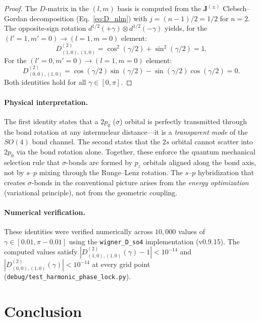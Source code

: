 \documentclass[aps,pra,twocolumn,superscriptaddress,longbibliography]{revtex4-2}
\begin{document}
\begin{proof}
The $D$-matrix in the $(l, m)$ basis is computed from the
$\mathbf{J}^{(\pm)}$ Clebsch--Gordan decomposition
(Eq.~\eqref{eq:D_nlm}) with $j = (n-1)/2 = 1/2$ for $n = 2$.
The opposite-sign rotation $d^{1/2}(+\gamma) \otimes d^{1/2}(-\gamma)$
yields, for the $(l' = 1, m' = 0) \to (l = 1, m = 0)$ element:
\begin{equation}
D^{(2)}_{(1,0),(1,0)} = \cos^2(\gamma/2) + \sin^2(\gamma/2) = 1.
\end{equation}
For the $(l' = 0, m' = 0) \to (l = 1, m = 0)$ element:
\begin{equation}
D^{(2)}_{(0,0),(1,0)} = \cos(\gamma/2)\sin(\gamma/2)
                       - \sin(\gamma/2)\cos(\gamma/2) = 0.
\end{equation}
Both identities hold for all $\gamma \in [0, \pi]$.
\end{proof}

\paragraph{Physical interpretation.}
The first identity states that a $2p_0$ ($\sigma$) orbital is perfectly
transmitted through the bond rotation at any internuclear distance---it is
a \emph{transparent mode} of the $SO(4)$ bond channel.  The second states
that the $2s$ orbital cannot scatter into $2p_0$ via the bond rotation
alone.  Together, these enforce the quantum mechanical selection rule that
$\sigma$-bonds are formed by $p_z$ orbitals aligned along the bond axis,
not by $s$--$p$ mixing through the Runge--Lenz rotation.  The $s$--$p$
hybridization that creates $\sigma$-bonds in the conventional picture
arises from the \emph{energy optimization} (variational principle), not
from the geometric coupling.

\paragraph{Numerical verification.}
These identities were verified numerically across $10{,}000$ values of
$\gamma \in [0.01, \pi - 0.01]$ using the \texttt{wigner\_D\_so4}
implementation (v0.9.15).  The computed values satisfy
$|D^{(2)}_{(1,0),(1,0)}(\gamma) - 1| < 10^{-14}$ and
$|D^{(2)}_{(0,0),(1,0)}(\gamma)| < 10^{-14}$ at every grid point
(\texttt{debug/test\_harmonic\_phase\_lock.py}).


\section{Conclusion}
\label{sec:conclusion}
\end{document}
